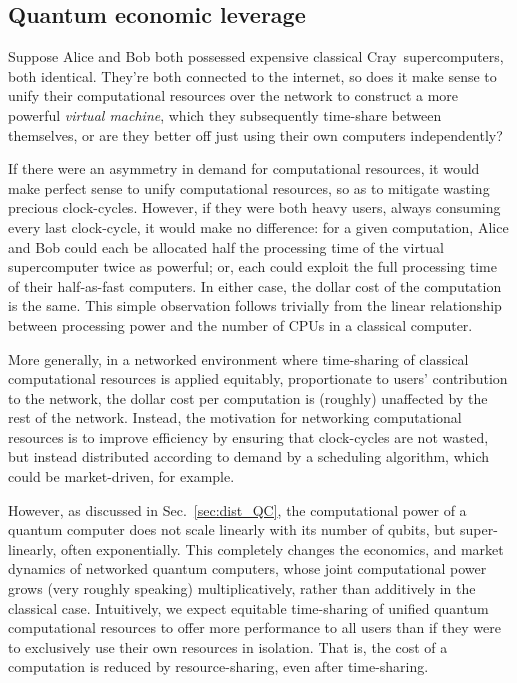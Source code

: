 \documentclass[aps, rmp, twocolumn, amsmath, amssymb, nofootinbib, superscriptaddress, longbibliography, floatfix, table-of-contents, eqsecnum]{revtex4-1}
\begin{document}
\subsection{Quantum economic leverage}\label{sec:quant_ec_lev}

Suppose Alice and Bob both possessed expensive classical Cray\texttrademark\, supercomputers, both identical. They're both connected to the internet, so does it make sense to unify their computational resources over the network to construct a more powerful \textit{virtual machine}, which they subsequently time-share between themselves, or are they better off just using their own computers independently?

If there were an asymmetry in demand for computational resources, it would make perfect sense to unify computational resources, so as to mitigate wasting precious clock-cycles. However, if they were both heavy users, always consuming every last clock-cycle, it would make no difference: for a given computation, Alice and Bob could each be allocated half the processing time of the virtual supercomputer twice as powerful; or, each could exploit the full processing time of their half-as-fast computers. In either case, the dollar cost of the computation is the same. This simple observation follows trivially from the linear relationship between processing power and the number of CPUs in a classical computer.

More generally, in a networked environment where time-sharing of classical computational resources is applied equitably, proportionate to users' contribution to the network, the dollar cost per computation is (roughly) unaffected by the rest of the network. Instead, the motivation for networking computational resources is to improve efficiency by ensuring that clock-cycles are not wasted, but instead distributed according to demand by a scheduling algorithm, which could be market-driven, for example.

However, as discussed in Sec.~\ref{sec:dist_QC}, the computational power of a quantum computer does not scale linearly with its number of qubits, but super-linearly, often exponentially. This completely changes the economics, and market dynamics of networked quantum computers, whose joint computational power grows (very roughly speaking) multiplicatively, rather than additively in the classical case. Intuitively, we expect equitable time-sharing of unified quantum computational resources to offer more performance to all users than if they were to exclusively use their own resources in isolation. That is, the cost of a computation is reduced by resource-sharing, even after time-sharing.
\end{document}
